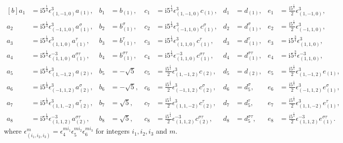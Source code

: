 \documentclass[11pt]{amsart}
\numberwithin{equation}{section}
\numberwithin{table}{section}
\newcommand\<{\langle}
\begin{document}
{\small $$\begin{aligned}[b]
		a_1 & = \mathrm{i} 5^{\frac{1}{4}} \epsilon^3_{(1,-1,0)}a_{(1)},
		&	b_1 & =b_{(1)},
		& c_1 &= \mathrm{i} 5^{\frac{1}{4}} \epsilon^3_{(1,-1,0)}c_{(1)},
		&	d_1  &= d_{(1)},
		&  e_1 & =  \frac{\mathrm{i} 5^{\frac{1}{4}}}{2} \epsilon^3_{(1,-1,0)},  \\
		a_2 &=\mathrm{i} 5^{\frac{1}{4}}  \epsilon^3_{(-1, 1,0)}a_{(1)}^{\sigma},
		&	b_2  & = b_{(1)}^{\sigma},
		&	c_2 & =\mathrm{i} 5^{\frac{1}{4}} \epsilon^3_{(-1, 1,0)}c_{(1)}^{\sigma},
		&	d_2 &  =  d_{(1)}^{\sigma},
		&	e_2 & = \frac{\mathrm{i} 5^{\frac{1}{4}}}{2}\epsilon^3_{(-1, 1,0)},\\
		a_3 & = \mathrm{i} 5^{\frac{1}{4}}\epsilon^3_{(1, 1,0)}a_{(1)}^{\tau},
		& b_3 &  = b_{(1)}^{\tau},
		& c_3  &= \mathrm{i} 5^{\frac{1}{4}} \epsilon^3_{(1, 1,0)}c_{(1)}^{\tau},
		& d_3  & =  d_{(1)}^{\tau},
		& e_3  &= \mathrm{i} 5^{\frac{3}{4}}
		\epsilon^3_{(1, 1,0)},  \\
		a_4 & = \mathrm{i} 5^{\frac{1}{4}} \epsilon^{-3}_{(1, 1,0)}a_{(1)}^{\sigma\tau},
		&	b_4  & =  b_{(1)}^{\sigma\tau},
		&	c_4 & = \mathrm{i} 5^{\frac{1}{4}} \epsilon^{-3}_{(1, 1,0)}c_{(1)}^{\sigma\tau},
		&	d_4   &  = d_{(1)}^{\sigma\tau},
		&	e_4  &  = \mathrm{i} 5^{\frac{3}{4}}
		\epsilon^{-3}_{(1, 1,0)},\\
		a_5 & = \mathrm{i} 5^{\frac{1}{4}} \epsilon^3_{(1,-1,2)}a_{(2)},
		&	b_5  & =  -\sqrt{5}
		&	c_5 & = \frac{\mathrm{i} 5^{\frac{1}{4}}}{2} \epsilon^3_{(1,-1,2)}c_{(2)},
		&	d_5  &= d_{(2)},
		&	e_5 &  = \frac{\mathrm{i} 5^{\frac{1}{4}}}{2} \epsilon^3_{(1 ,-1,2)}e_{(1)},\\
		a_6 & = \mathrm{i} 5^{\frac{1}{4}} \epsilon^3_{(-1, 1,2)}a_{(2)}^{\sigma},
		& b_6 &  =  - \sqrt{5},
		& c_6 & =  \frac{\mathrm{i} 5^{\frac{1}{4}}}{2}  \epsilon^3_{(-1, 1,2)}c_{(2)}^{\sigma},
		& d_6 & = d_5^{\sigma},
		& e_6 &  =\frac{\mathrm{i} 5^{\frac{1}{4}}}{2}  \epsilon^3_{(-1, 1,2)}e_{(1)}^{\sigma},\\
		a_7  &=\mathrm{i} 5^{\frac{1}{4}} \epsilon^3_{(1, 1,-2)}a_{(2)}^{\tau},
		& b_7 &  =   \sqrt{5},
		& c_7 & = \frac{\mathrm{i} 5^{\frac{1}{4}}}{2}  \epsilon^3_{(1,1, -2)}c_{(2)}^{\tau},
		& d_7 &=d_5^{\tau},
		& e_7 & = \frac{\mathrm{i} 5^{\frac{1}{4}}}{2}  \epsilon^3_{(1,1,-2)}e_{(1)}^{\tau},\\
		a_8  &= \mathrm{i} 5^{\frac{1}{4}} \epsilon^{-3}_{(1,1,2)}a_{(2)}^{\sigma\tau},
		& b_8 &  =   \sqrt{5},
		& c_8 & = \frac{\mathrm{i} 5^{\frac{1}{4}}}{2}  \epsilon^{-3}_{(1,1,2)}c_{(2)}^{\sigma\tau},
		& d_8& = d_5^{\sigma\tau},
		& e_8  & = \frac{\mathrm{i} 5^{\frac{1}{4}}}{2}  \epsilon^{-3}_{(1,1,2)}e_{(1)}^{\sigma\tau}.
	\end{aligned}$$}
where $\epsilon^m_{(i_1, i_2, i_3)}=\epsilon_4^{m i_1}\epsilon_5^{m i_2}\epsilon_6^{m i_3}$
for  integers $ i_1, i_2, i_3$ and $m$.
\end{document}
